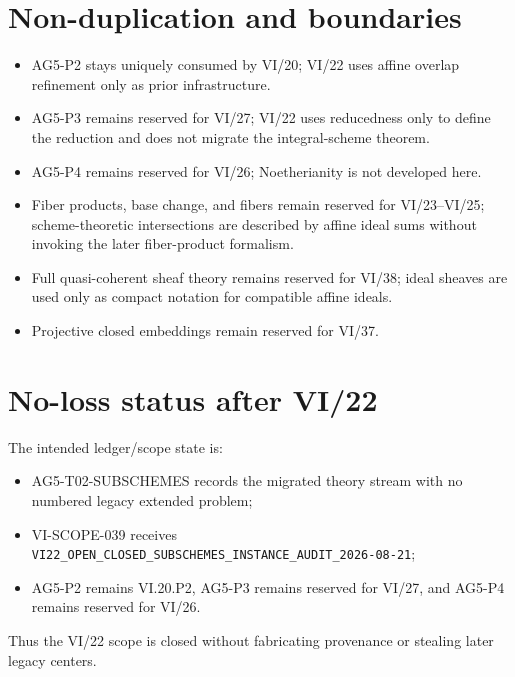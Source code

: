 \section*{Non-duplication and boundaries}
\begin{itemize}
\item AG5-P2 stays uniquely consumed by VI/20; VI/22 uses affine overlap refinement only as prior infrastructure.
\item AG5-P3 remains reserved for VI/27; VI/22 uses reducedness only to define the reduction and does not migrate the integral-scheme theorem.
\item AG5-P4 remains reserved for VI/26; Noetherianity is not developed here.
\item Fiber products, base change, and fibers remain reserved for VI/23--VI/25; scheme-theoretic intersections are described by affine ideal sums without invoking the later fiber-product formalism.
\item Full quasi-coherent sheaf theory remains reserved for VI/38; ideal sheaves are used only as compact notation for compatible affine ideals.
\item Projective closed embeddings remain reserved for VI/37.
\end{itemize}

\section*{No-loss status after VI/22}
The intended ledger/scope state is:
\begin{itemize}
\item AG5-T02-SUBSCHEMES records the migrated theory stream with no numbered legacy extended problem;
\item VI-SCOPE-039 receives \texttt{VI22\_OPEN\_CLOSED\_SUBSCHEMES\_INSTANCE\_AUDIT\_2026-08-21};
\item AG5-P2 remains VI.20.P2, AG5-P3 remains reserved for VI/27, and AG5-P4 remains reserved for VI/26.
\end{itemize}
Thus the VI/22 scope is closed without fabricating provenance or stealing later legacy centers.
